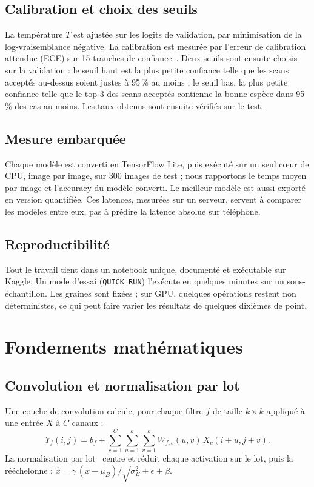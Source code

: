 \documentclass[conference]{IEEEtran}
\begin{document}
\subsection{Calibration et choix des seuils}
La température $T$ est ajustée sur les logits de validation, par minimisation de la log-vraisemblance négative. La calibration est mesurée par l'erreur de calibration attendue (ECE) sur 15 tranches de confiance~\cite{naeini2015}. Deux seuils sont ensuite choisis sur la validation : le seuil haut est la plus petite confiance telle que les scans acceptés au-dessus soient justes à 95\,\% au moins ; le seuil bas, la plus petite confiance telle que le top-3 des scans acceptés contienne la bonne espèce dans 95\,\% des cas au moins. Les taux obtenus sont ensuite vérifiés sur le test.

\subsection{Mesure embarquée}
Chaque modèle est converti en TensorFlow Lite, puis exécuté sur un seul cœur de CPU, image par image, sur 300 images de test ; nous rapportons le temps moyen par image et l'accuracy du modèle converti. Le meilleur modèle est aussi exporté en version quantifiée. Ces latences, mesurées sur un serveur, servent à comparer les modèles entre eux, pas à prédire la latence absolue sur téléphone.

\subsection{Reproductibilité}
Tout le travail tient dans un notebook unique, documenté et exécutable sur Kaggle. Un mode d'essai (\texttt{QUICK\_RUN}) l'exécute en quelques minutes sur un sous-échantillon. Les graines sont fixées ; sur GPU, quelques opérations restent non déterministes, ce qui peut faire varier les résultats de quelques dixièmes de point.

\section{Fondements mathématiques}\label{sec:bg-math}
\subsection{Convolution et normalisation par lot}
Une couche de convolution calcule, pour chaque filtre $f$ de taille $k{\times}k$ appliqué à une entrée $X$ à $C$ canaux :
\begin{equation}
Y_{f}(i,j) = b_f + \sum_{c=1}^{C}\sum_{u=1}^{k}\sum_{v=1}^{k} W_{f,c}(u,v)\, X_c(i+u, j+v).
\end{equation}
La normalisation par lot~\cite{ioffe2015} centre et réduit chaque activation sur le lot, puis la rééchelonne : $\hat x = \gamma\,(x-\mu_B)/\sqrt{\sigma_B^2+\epsilon} + \beta$.
\end{document}
